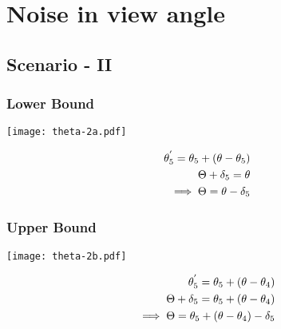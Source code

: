 \section{Noise in view angle}

\subsection{Scenario - II}

\subsubsection{Lower Bound}

\begin{minipage}[t]{0.5\textwidth}
\texttt{[image: theta-2a.pdf]}   
\end{minipage}
\begin{minipage}[t]{0.5\textwidth}
\vspace{-1in}
\begin{equation*}
\centering
\begin{aligned}
\theta_5^{'} = \theta_5 + (\theta - \theta_5)\\
\Theta + \delta_5 = \theta \\
\implies \Theta = \theta - \delta_5
\end{aligned}
\end{equation*}
\end{minipage}









\subsubsection{Upper Bound}

\begin{minipage}[t]{0.5\textwidth}
\texttt{[image: theta-2b.pdf]}   
\end{minipage}
\begin{minipage}[t]{0.5\textwidth}
\vspace{-1in}
\begin{equation*}
\centering
\begin{aligned}
\theta_5^{'} = \theta_5 + (\theta - \theta_4)\\
\Theta + \delta_5 = \theta_5 + (\theta - \theta_4)\\
\implies \Theta = \theta_5 + (\theta - \theta_4) - \delta_5
\end{aligned}
\end{equation*}
\end{minipage}






